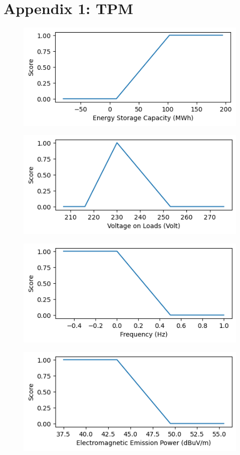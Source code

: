 \documentclass{article}
\begin{document}
\section*{Appendix 1: TPM}
\begin{figure}[H]
\center
\includegraphics[scale=0.7]{tpm1}
\end{figure}
\begin{figure}[H]
\center
\includegraphics[scale=0.7]{tpm2}
\end{figure}
\begin{figure}[H]
\center
\includegraphics[scale=0.7]{tpm3}
\end{figure}
\begin{figure}[H]
\center
\includegraphics[scale=0.7]{tpm4}
\end{figure}
\end{document}
